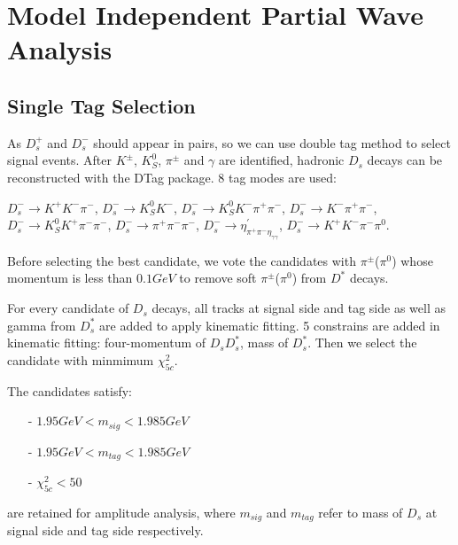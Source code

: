 \section{Model Independent Partial Wave Analysis}
\subsection{Single Tag Selection}
As $D_{s}^{+}$ and $D_{s}^{-}$ should appear in pairs, so we can use double tag method to select signal events. After $K^{\pm}$, $K_S^{0}$, $\pi^{\pm}$ and $\gamma$ are identified, hadronic $D_{s}$ decays can be reconstructed with the DTag package. 8 tag modes are used:

$D_{s}^{-} \rightarrow K^{+}K^{-}\pi^{-}$, $D_{s}^{-} \rightarrow K_{S}^{0}K^{-}$, $D_{s}^{-} \rightarrow K_{S}^{0}K^{-}\pi^{+}\pi^{-}$, $D_{s}^{-} \rightarrow K^{-}\pi^{+}\pi^{-}$, $D_{s}^{-} \rightarrow K_{S}^{0}K^{+}\pi^{-}\pi^{-}$, $D_{s}^{-} \rightarrow \pi^{+}\pi^{-}\pi^{-}$, $D_{s}^{-} \rightarrow \eta^{'}_{\pi^{+}\pi^{-}\eta_{\gamma\gamma}}$, $D_{s}^{-} \rightarrow K^{+}K^{-}\pi^{-}\pi^{0}$.


Before selecting the best candidate,  we vote the candidates with $\pi^{\pm}$($\pi^{0}$) whose momentum is less than $0.1GeV$ to remove soft $\pi^{\pm}$($\pi^{0}$) from $D^{*}$ decays.


For every candidate of $D_{s}$ decays, all tracks at signal side and tag side as well as gamma from $D_{s}^{*}$ are added to apply kinematic fitting. 5 constrains are added in kinematic fitting: four-momentum of $D_{s}D_{s}^{*}$, mass of $D_{s}^{*}$. Then we select the candidate with minmimum $\chi_{5c}^{2}$.  

The candidates satisfy:
\begin{itemize}
	\item[-] $1.95GeV < m_{sig} < 1.985GeV$
	\item[-] $1.95GeV < m_{tag} < 1.985GeV$
	\item[-] $\chi_{5c}^{2} < 50 $
\end{itemize}
are retained for amplitude analysis, where $m_{sig}$ and $m_{tag}$ refer to mass of $D_{s}$ at signal side and tag side respectively.


